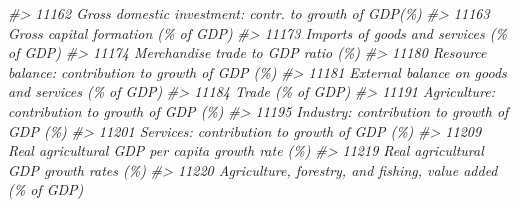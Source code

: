 \documentclass[
]{bxjsbook}
\newenvironment{Shaded}{\begin{snugshade}}{\end{snugshade}}
\newcommand{\CommentTok}[1]{\textcolor[rgb]{0.56,0.35,0.01}{\textit{#1}}}
\theoremstyle{definition}
\theoremstyle{definition}
\theoremstyle{definition}
\theoremstyle{definition}
\theoremstyle{remark}
\begin{document}
\begin{Shaded}
\begin{Highlighting}[]
\CommentTok{\#\textgreater{} 11162                                                                                                                     Gross domestic investment: contr. to growth of GDP(\%)}
\CommentTok{\#\textgreater{} 11163                                                                                                                                        Gross capital formation (\% of GDP)}
\CommentTok{\#\textgreater{} 11173                                                                                                                                  Imports of goods and services (\% of GDP)}
\CommentTok{\#\textgreater{} 11174                                                                                                                                        Merchandise trade to GDP ratio (\%)}
\CommentTok{\#\textgreater{} 11180                                                                                                                       Resource balance: contribution to growth of GDP (\%)}
\CommentTok{\#\textgreater{} 11181                                                                                                                         External balance on goods and services (\% of GDP)}
\CommentTok{\#\textgreater{} 11184                                                                                                                                                          Trade (\% of GDP)}
\CommentTok{\#\textgreater{} 11191                                                                                                                            Agriculture: contribution to growth of GDP (\%)}
\CommentTok{\#\textgreater{} 11195                                                                                                                               Industry: contribution to growth of GDP (\%)}
\CommentTok{\#\textgreater{} 11201                                                                                                                               Services: contribution to growth of GDP (\%)}
\CommentTok{\#\textgreater{} 11209                                                                                                                          Real agricultural GDP per capita growth rate (\%)}
\CommentTok{\#\textgreater{} 11219                                                                                                                                    Real agricultural GDP growth rates (\%)}
\CommentTok{\#\textgreater{} 11220                                                                                                                Agriculture, forestry, and fishing, value added (\% of GDP)}

\end{Highlighting}
\end{Shaded}
\end{document}

